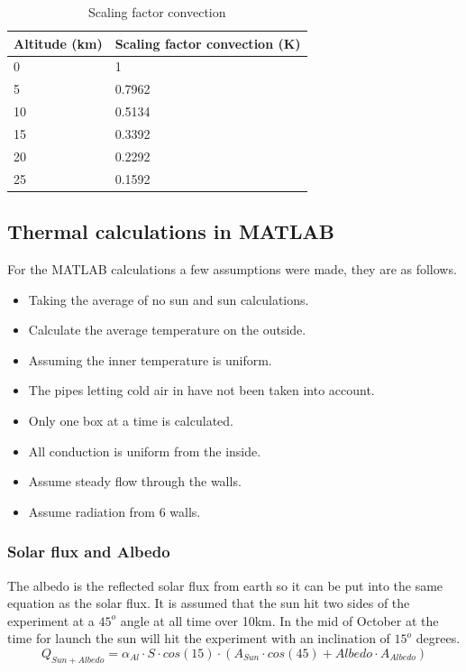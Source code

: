 \begin{table}[H]
\centering
\caption{Scaling factor convection}
\label{tab:scaling-factorconvection}
\begin{tabular}{|l|l|}
\hline
Altitude (km) & Scaling factor convection (K) \\ \hline
0             & 1                             \\ \hline
5             & 0.7962                        \\ \hline
10            & 0.5134                        \\ \hline
15            & 0.3392                        \\ \hline
20            & 0.2292                        \\ \hline
25            & 0.1592                        \\ \hline
\end{tabular}
\end{table}

\subsection{Thermal calculations in MATLAB}
For the MATLAB calculations a few assumptions were made, they are as follows.
\begin{itemize}
    \item Taking the average of no sun and sun calculations.
    \item Calculate the average temperature on the outside.
    \item Assuming the inner temperature is uniform.
    \item The pipes letting cold air in have not been taken into account.
    \item Only one box at a time is calculated.
    \item All conduction is uniform from the inside.
    \item Assume steady flow through the walls.
    \item Assume radiation from 6 walls.
\end{itemize}

\subsubsection{Solar flux and Albedo}
The albedo is the reflected solar flux from earth so it can be put into the same equation as the solar flux. It is assumed that the sun hit two sides of the experiment at a $45^o$ angle at all time over 10km. In the mid of October at the time for launch the sun will hit the experiment with an inclination of $15^o$ degrees.
\begin{equation*}
    Q_{Sun+Albedo} = \alpha_{Al}\cdot S \cdot cos(15) \cdot (A_{Sun} \cdot cos(45) + Albedo \cdot A_{Albedo})
\end{equation*}

